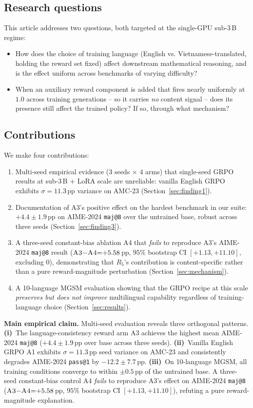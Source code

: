 \documentclass[journal,onecolumn,11pt]{IEEEtran}
\newcommand{\armA}{\textsc{A1}}
\newcommand{\armC}{\textsc{A3}}
\newcommand{\armD}{\textsc{A4}}
\newcommand{\R}[1]{R_{#1}}
\newcommand{\boxedclaim}[1]{%
  \begin{tcolorbox}[colback=blue!4,colframe=blue!50!black,boxrule=0.5pt,%
                   left=4pt,right=4pt,top=4pt,bottom=4pt]%
  \small #1 \end{tcolorbox}}
\begin{document}
\subsection{Research questions}
This article addresses two questions, both targeted at the single-GPU
sub-3\,B regime:
\begin{itemize}
\item[\textbf{Q1.}] How does the choice of training language (English vs.
Vietnamese-translated, holding the reward set fixed) affect downstream
mathematical reasoning, and is the effect uniform across benchmarks of
varying difficulty?
\item[\textbf{Q2.}] When an auxiliary reward component is added that fires
nearly uniformly at $1.0$ across training generations -- so it carries
\emph{no} content signal -- does its presence still affect the trained
policy? If so, through what mechanism?
\end{itemize}

\subsection{Contributions}
We make four contributions:
\begin{enumerate}
\item Multi-seed empirical evidence (3 seeds $\times$ 4 arms) that
single-seed GRPO results at sub-3\,B + LoRA scale are unreliable: vanilla
English GRPO exhibits $\sigma{=}11.3$\,pp variance on AMC-23
(Section~\ref{sec:finding1}).
\item Documentation of \armC{}'s positive effect on the hardest benchmark
in our suite: $+4.4 \pm 1.9$\,pp on AIME-2024 \texttt{maj@8} over the
untrained base, robust across three seeds
(Section~\ref{sec:finding3}).
\item A three-seed constant-bias ablation \armD{} that \emph{fails} to
reproduce \armC{}'s AIME-2024 \texttt{maj@8} result
($\armC{}{-}\armD{}{=}{+}5.58$\,pp, $95\%$ bootstrap CI
$[+1.13, +11.10]$, excluding $0$), demonstrating that $\R{5}$'s
contribution is content-specific rather than a pure reward-magnitude
perturbation (Section~\ref{sec:mechanism}).
\item A 10-language MGSM evaluation showing that the GRPO recipe at this
scale \emph{preserves but does not improve} multilingual capability
regardless of training-language choice
(Section~\ref{sec:results}).
\end{enumerate}

\boxedclaim{%
\textbf{Main empirical claim.} Multi-seed evaluation reveals three
orthogonal patterns. \textbf{(i)}~The language-consistency reward arm
\armC{} achieves the highest mean AIME-2024 \texttt{maj@8}
($+4.4 \pm 1.9$\,pp over base across three seeds). \textbf{(ii)}~Vanilla
English GRPO \armA{} exhibits $\sigma{=}11.3$\,pp seed variance on
AMC-23 and consistently degrades AIME-2024 \texttt{pass@1} by
$-12.2 \pm 7.7$\,pp. \textbf{(iii)}~On 10-language MGSM, all training
conditions converge to within $\pm 0.5$\,pp of the untrained base. A
three-seed constant-bias control \armD{} \emph{fails} to reproduce
\armC{}'s effect on AIME-2024 \texttt{maj@8}
($\armC{}{-}\armD{}{=}{+}5.58$\,pp, $95\%$ bootstrap CI
$[+1.13, +11.10]$), refuting a pure reward-magnitude explanation.
}
\end{document}
